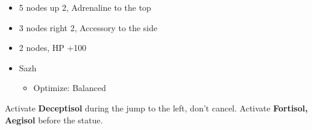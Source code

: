 \begin{multicols}{2}
\begin{menu}
\begin{itemize}
\begin{itemize}
\begin{itemize}
            \begin{itemize}
                \item 5 nodes up 2, Adrenaline to the top
                \item 3 nodes right 2, Accessory to the side
                \item 2 nodes, HP +100
            \end{itemize}
        \end{itemize}
    \end{itemize}
    \equip
    \begin{itemize}
        \item Sazh
        \begin{itemize}
            \item Optimize: Balanced
        \end{itemize}
    \end{itemize}
\end{itemize}
\end{menu}

Activate \textbf{Deceptisol} during the jump to the left, don't cancel.
Activate \textbf{Fortisol, Aegisol} before the statue.
\vfill



\end{multicols}
